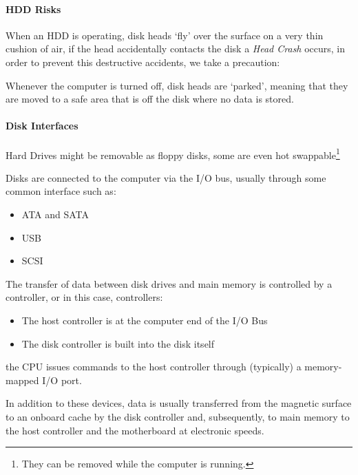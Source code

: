 \documentclass[openright, twoside]{report}
\theoremstyle{definition}
\theoremstyle{example}
\begin{document}
\paragraph{HDD Risks}

When an HDD is operating, disk heads `fly' over the surface on a very thin
cushion of air, if the head accidentally contacts the disk a \emph{Head Crash}
occurs, in order to prevent this destructive accidents, we take a precaution:

Whenever the computer is turned off, disk heads are `parked', meaning that they
are moved to a safe area that is off the disk where no data is stored.

\paragraph{Disk Interfaces} %
Hard Drives might be removable as floppy disks, some are even hot swappable\footnote{They can be removed while the computer is running.}

Disks are connected to the computer via the I/O bus, usually through some common interface such as:
\begin{multicols}{3}
	\begin{itemize}
		\item ATA and SATA
		\item USB
		\item SCSI
	\end{itemize}
\end{multicols}


The transfer of data between disk drives and main memory is controlled by a controller, %
or in this case, controllers:

\begin{itemize}
	\item The host controller is at the computer end of the I/O Bus
	\item The disk controller is built into the disk itself
\end{itemize}

the CPU issues commands to the host controller through (typically) a memory-mapped I/O port.

In addition to these devices, data is usually transferred from the magnetic surface to an 
onboard cache by the disk controller and, subsequently, to main memory to the host controller
and the motherboard at electronic speeds.
\end{document}
